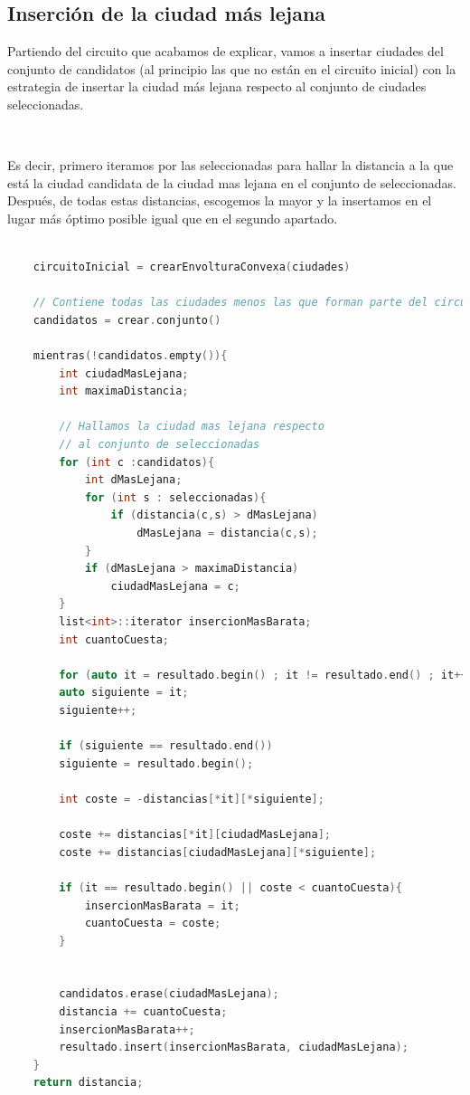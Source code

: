 \documentclass{article}
\begin{document}
	\subsection{Inserción de la ciudad más lejana}
	Partiendo del circuito que acabamos de explicar, vamos a insertar ciudades del conjunto de candidatos (al principio las que no están en el circuito inicial) con la estrategia de insertar la ciudad más lejana respecto al conjunto de ciudades seleccionadas.
	
	\
	
	Es decir, primero iteramos por las seleccionadas para hallar la distancia a la que está la ciudad candidata de la ciudad mas lejana en el conjunto de seleccionadas.
	Después, de todas estas distancias, escogemos la mayor y la insertamos en el lugar más óptimo posible igual que en el segundo apartado.
	\begin{lstlisting}[language=c, caption =Pseudocódigo de inserción con envoltura convexa y ciudad más lejana]
	
	circuitoInicial = crearEnvolturaConvexa(ciudades)
	
	// Contiene todas las ciudades menos las que forman parte del circuito inicial
	candidatos = crear.conjunto()
	
	mientras(!candidatos.empty()){
		int ciudadMasLejana;
		int maximaDistancia;
		
		// Hallamos la ciudad mas lejana respecto
		// al conjunto de seleccionadas
		for (int c :candidatos){
			int dMasLejana;
			for (int s : seleccionadas){
				if (distancia(c,s) > dMasLejana)
					dMasLejana = distancia(c,s);
			}
			if (dMasLejana > maximaDistancia)
				ciudadMasLejana = c;
		}
		list<int>::iterator insercionMasBarata;
		int cuantoCuesta;
		
		for (auto it = resultado.begin() ; it != resultado.end() ; it++){
		auto siguiente = it;
		siguiente++;
		
		if (siguiente == resultado.end())
		siguiente = resultado.begin();
		
		int coste = -distancias[*it][*siguiente];
		
		coste += distancias[*it][ciudadMasLejana];
		coste += distancias[ciudadMasLejana][*siguiente];
		
		if (it == resultado.begin() || coste < cuantoCuesta){
			insercionMasBarata = it;
			cuantoCuesta = coste;
		}
		
		
		candidatos.erase(ciudadMasLejana);
		distancia += cuantoCuesta;
		insercionMasBarata++;
		resultado.insert(insercionMasBarata, ciudadMasLejana);	
	}
	return distancia;

	\end{lstlisting}
	
\end{document}
